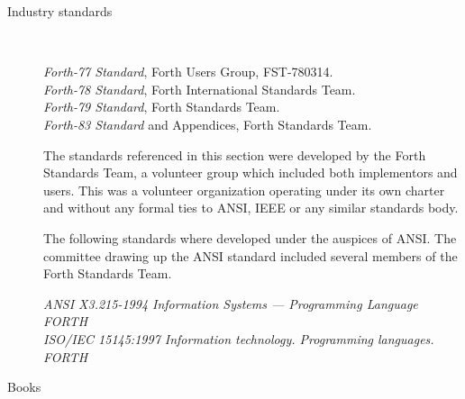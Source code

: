 \label{annex:bib}

\begin{description}

\item[Industry standards]~

	\emph{Forth-77 Standard}, Forth Users Group, FST-780314. \\
	\emph{Forth-78 Standard}, Forth International Standards Team. \\
	\emph{Forth-79 Standard}, Forth Standards Team. \\
	\emph{Forth-83 Standard} and Appendices, Forth Standards Team.

	The standards referenced in this section were developed by the
	Forth Standards Team, a volunteer group which included both
	implementors and users. This was a volunteer organization operating
	under its own charter and without any formal ties to ANSI, IEEE or
	any similar standards body.

	The following standards where developed under the auspices of
    ANSI.  The committee drawing up the ANSI standard included
    several members of the Forth Standards Team.

	\emph{ANSI X3.215-1994 Information Systems --- Programming Language FORTH} \\
    \emph{ISO/IEC 15145:1997 Information technology.  Programming languages.  FORTH} \\


\item[Books]~

\end{description}
